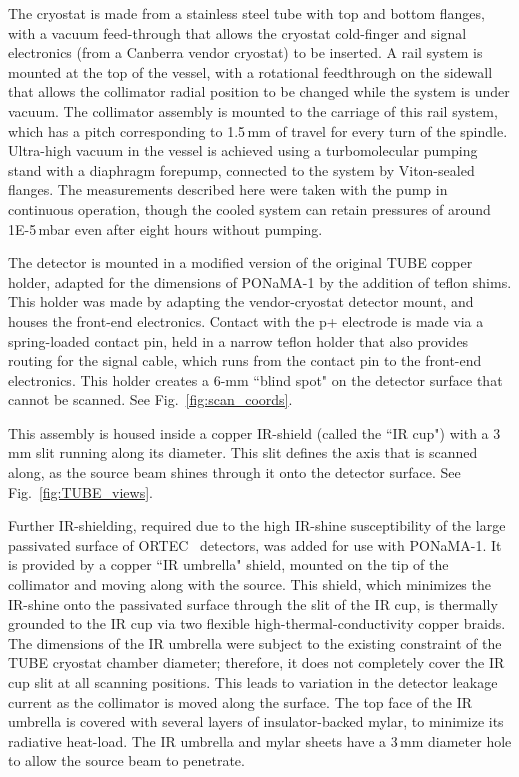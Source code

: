 The cryostat is made from a stainless steel tube with top and bottom flanges, with a vacuum feed-through that allows the cryostat cold-finger and signal electronics (from a Canberra vendor cryostat) to be inserted. A rail system is mounted at the top of the vessel, with a rotational feedthrough on the sidewall that allows the collimator radial position to be changed while the system is under vacuum. The collimator assembly is mounted to the carriage of this rail system, which has a pitch corresponding to 1.5\,mm of travel for every turn of the spindle. Ultra-high vacuum in the vessel is achieved using a turbomolecular pumping stand with a diaphragm forepump, connected to the system by Viton-sealed flanges. The measurements described here were taken with the pump in continuous operation, though the cooled system can retain pressures of around 1E-5\,mbar even after eight hours without pumping. 

The detector is mounted in a modified version of the original TUBE copper holder, adapted for the dimensions of PONaMA-1 by the addition of teflon shims. This holder was made by adapting the vendor-cryostat detector mount, and houses the front-end electronics. Contact with the p+ electrode is made via a spring-loaded contact pin, held in a narrow teflon holder that also provides routing for the signal cable, which runs from the contact pin to the front-end electronics. This holder creates a 6-mm ``blind spot" on the detector surface that cannot be scanned. See Fig.~\ref{fig:scan_coords}. 

This assembly is housed inside a copper IR-shield (called the ``IR cup") with a 3\,mm slit running along its diameter. This slit defines the axis that is scanned along, as the source beam shines through it onto the detector surface. See Fig.~\ref{fig:TUBE_views}. 

Further IR-shielding, required due to the high IR-shine susceptibility of the large passivated surface of ORTEC \ppc\ detectors, was added for use with PONaMA-1. It is provided by a copper ``IR umbrella" shield, mounted on the tip of the collimator and moving along with the source. This shield, which minimizes the IR-shine onto the passivated surface through the slit of the IR cup, is thermally grounded to the IR cup via two flexible high-thermal-conductivity copper braids. The dimensions of the IR umbrella were subject to the existing constraint of the TUBE cryostat chamber diameter; therefore, it does not completely cover the IR cup slit at all scanning positions. This leads to variation in the detector leakage current as the collimator is moved along the surface. The top face of the IR umbrella is covered with several layers of insulator-backed mylar, to minimize its radiative heat-load. The IR umbrella and mylar sheets have a 3\,mm diameter hole to allow the source beam to penetrate. 

